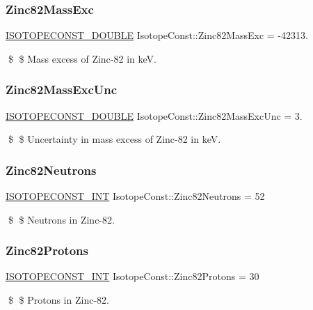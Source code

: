 \subsubsection{\texorpdfstring{Zinc82\+Mass\+Exc}{Zinc82MassExc}}
{\footnotesize\ttfamily \mbox{\hyperlink{group___isotope_const-_macros_ga8f45a7272ce02c0b4c65c44636ed719a}{I\+S\+O\+T\+O\+P\+E\+C\+O\+N\+S\+T\+\_\+\+D\+O\+U\+B\+LE}} Isotope\+Const\+::\+Zinc82\+Mass\+Exc = -\/42313.}

\$ \$ Mass excess of Zinc-\/82 in keV. \mbox{\label{group___isotope_const-_zinc-_zn82_ga17a62c38bc68e38c361665b83f2d63d0}} 
\subsubsection{\texorpdfstring{Zinc82\+Mass\+Exc\+Unc}{Zinc82MassExcUnc}}
{\footnotesize\ttfamily \mbox{\hyperlink{group___isotope_const-_macros_ga8f45a7272ce02c0b4c65c44636ed719a}{I\+S\+O\+T\+O\+P\+E\+C\+O\+N\+S\+T\+\_\+\+D\+O\+U\+B\+LE}} Isotope\+Const\+::\+Zinc82\+Mass\+Exc\+Unc = 3.}

\$ \$ Uncertainty in mass excess of Zinc-\/82 in keV. \mbox{\label{group___isotope_const-_zinc-_zn82_ga09a9601314ca512758ded688b3ee9739}} 
\subsubsection{\texorpdfstring{Zinc82\+Neutrons}{Zinc82Neutrons}}
{\footnotesize\ttfamily \mbox{\hyperlink{group___isotope_const-_macros_ga5f18360b3e99483a35c32d789e62621c}{I\+S\+O\+T\+O\+P\+E\+C\+O\+N\+S\+T\+\_\+\+I\+NT}} Isotope\+Const\+::\+Zinc82\+Neutrons = 52}

\$ \$ Neutrons in Zinc-\/82. \mbox{\label{group___isotope_const-_zinc-_zn82_gac28e1a125725423344d80d97d423941f}} 
\subsubsection{\texorpdfstring{Zinc82\+Protons}{Zinc82Protons}}
{\footnotesize\ttfamily \mbox{\hyperlink{group___isotope_const-_macros_ga5f18360b3e99483a35c32d789e62621c}{I\+S\+O\+T\+O\+P\+E\+C\+O\+N\+S\+T\+\_\+\+I\+NT}} Isotope\+Const\+::\+Zinc82\+Protons = 30}

\$ \$ Protons in Zinc-\/82. 